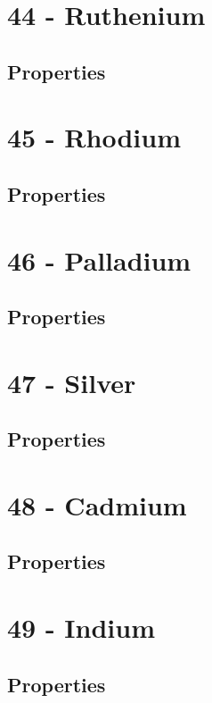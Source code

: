 \documentclass{book}
\begin{document}
\section{44 - Ruthenium}
\label{sec:elem-ruthenium}
\subsection{Properties}

\section{45 - Rhodium}
\label{sec:elem-rhodium}
\subsection{Properties}

\section{46 - Palladium}
\label{sec:elem-palladium}
\subsection{Properties}

\section{47 - Silver}
\label{sec:elem-silver}
\subsection{Properties}

\section{48 - Cadmium}
\label{sec:elem-cadmium}
\subsection{Properties}

\section{49 - Indium}
\label{sec:elem-indium}
\subsection{Properties}
\end{document}
